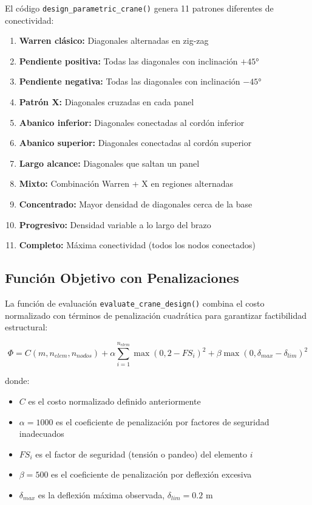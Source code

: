 \documentclass[10pt,a4paper]{article}
\begin{document}
El código \texttt{design\_parametric\_crane()} genera 11 patrones diferentes de conectividad:
\begin{enumerate}
\item \textbf{Warren clásico:} Diagonales alternadas en zig-zag
\item \textbf{Pendiente positiva:} Todas las diagonales con inclinación $+45°$
\item \textbf{Pendiente negativa:} Todas las diagonales con inclinación $-45°$
\item \textbf{Patrón X:} Diagonales cruzadas en cada panel
\item \textbf{Abanico inferior:} Diagonales conectadas al cordón inferior
\item \textbf{Abanico superior:} Diagonales conectadas al cordón superior
\item \textbf{Largo alcance:} Diagonales que saltan un panel
\item \textbf{Mixto:} Combinación Warren + X en regiones alternadas
\item \textbf{Concentrado:} Mayor densidad de diagonales cerca de la base
\item \textbf{Progresivo:} Densidad variable a lo largo del brazo
\item \textbf{Completo:} Máxima conectividad (todos los nodos conectados)
\end{enumerate}

\subsection{Función Objetivo con Penalizaciones}

La función de evaluación \texttt{evaluate\_crane\_design()} combina el costo normalizado con términos de penalización cuadrática para garantizar factibilidad estructural:

\begin{equation}
\Phi = C(m, n_{elem}, n_{nodos}) + \alpha \sum_{i=1}^{n_{elem}} \max(0, 2-FS_i)^2 + \beta \max(0, \delta_{max}-\delta_{lim})^2
\end{equation}

donde:
\begin{itemize}
\item $C$ es el costo normalizado definido anteriormente
\item $\alpha = 1000$ es el coeficiente de penalización por factores de seguridad inadecuados
\item $FS_i$ es el factor de seguridad (tensión o pandeo) del elemento $i$
\item $\beta = 500$ es el coeficiente de penalización por deflexión excesiva
\item $\delta_{max}$ es la deflexión máxima observada, $\delta_{lim} = 0.2$ m
\end{itemize}
\end{document}
